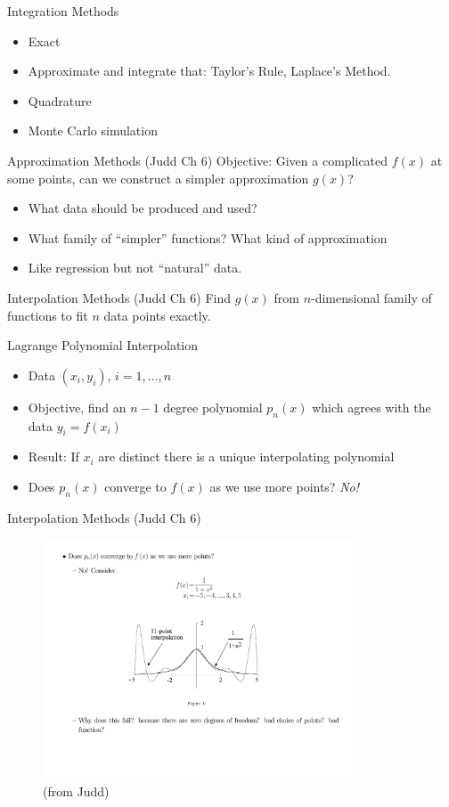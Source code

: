 \documentclass[xcolor=pdftex,dvipsnames,table,mathserif,aspectratio=169]{beamer}
\begin{document}
\begin{frame}{Integration Methods}
\begin{itemize}
\item Exact
\item Approximate and integrate that: Taylor's Rule, Laplace's Method.
\item Quadrature
\item Monte Carlo simulation
\end{itemize}
\end{frame}

\begin{frame}{Approximation Methods (Judd Ch 6)}
Objective: Given a complicated $f(x)$ at some points, can we construct a simpler approximation $g(x)$?
\begin{itemize}
\item What data should be produced and used?
\item What family of ``simpler'' functions? What kind of approximation
\item Like regression but not ``natural'' data.
\end{itemize}
\end{frame}

\begin{frame}{Interpolation Methods  (Judd Ch 6)}
Find $g(x)$ from $n$-dimensional family of functions to fit $n$ data points exactly.
\begin{block}{Lagrange Polynomial Interpolation}
\begin{itemize}
\item Data $(x_i,y_i)$, $i=1,\ldots,n$
\item Objective, find an $n-1$ degree polynomial $p_n(x)$ which agrees with the data $y_i = f(x_i)$
\item Result: If $x_i$ are distinct there is a unique interpolating polynomial
\item Does $p_n(x)$ converge to $f(x)$ as we use more points? \textit{No!}
\end{itemize}
\end{block}
\end{frame}

\begin{frame}{Interpolation Methods  (Judd Ch 6)}
\begin{figure}[htbp]
\begin{center}
\caption{(from Judd)}
\includegraphics[height=2.8in]{./resources/functionalapprox.pdf}
\end{center}
\end{figure}
\end{frame}
\end{document}
